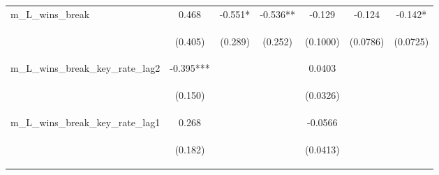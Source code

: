 \documentclass[]{article}
\begin{document}
\begin{center}
\begin{tabular}{lcccccc}
m\_L\_wins\_break & 0.468 & -0.551* & -0.536** & -0.129 & -0.124 & -0.142* \\
\vspace{4pt} & \begin{footnotesize}(0.405)\end{footnotesize} & \begin{footnotesize}(0.289)\end{footnotesize} & \begin{footnotesize}(0.252)\end{footnotesize} & \begin{footnotesize}(0.1000)\end{footnotesize} & \begin{footnotesize}(0.0786)\end{footnotesize} & \begin{footnotesize}(0.0725)\end{footnotesize} \\
m\_L\_wins\_break\_key\_rate\_lag2 & -0.395*** &  &  & 0.0403 &  &  \\
\vspace{4pt} & \begin{footnotesize}(0.150)\end{footnotesize} & \begin{footnotesize}\end{footnotesize} & \begin{footnotesize}\end{footnotesize} & \begin{footnotesize}(0.0326)\end{footnotesize} & \begin{footnotesize}\end{footnotesize} & \begin{footnotesize}\end{footnotesize} \\
m\_L\_wins\_break\_key\_rate\_lag1 & 0.268 &  &  & -0.0566 &  &  \\
\vspace{4pt} & \begin{footnotesize}(0.182)\end{footnotesize} & \begin{footnotesize}\end{footnotesize} & \begin{footnotesize}\end{footnotesize} & \begin{footnotesize}(0.0413)\end{footnotesize} & \begin{footnotesize}\end{footnotesize} & \begin{footnotesize}\end{footnotesize} \\

\end{tabular}
\end{center}
\end{document}
